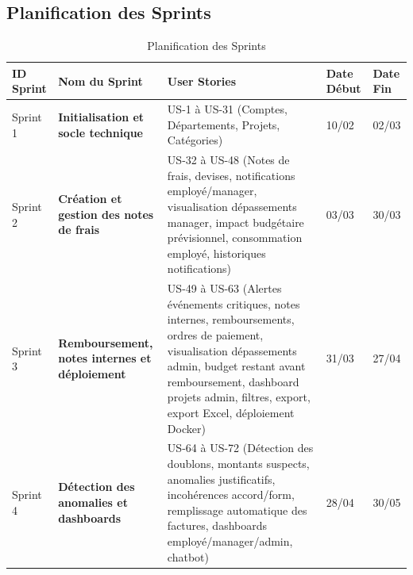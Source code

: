 \documentclass[12pt,a4paper]{report}
\begin{document}
\subsection{Planification des Sprints}



\begin{table}[H]

 \centering

 \caption{Planification des Sprints}

 \label{tab:sprints}

 \begin{tabular}{|p{2.2cm}|p{5cm}|p{4.8cm}|p{1.2cm}|p{1.2cm}|}

 \hline

 \textbf{ID Sprint} & \textbf{Nom du Sprint} & \textbf{User Stories} & \textbf{Date Début} & \textbf{Date Fin} \\

 \hline

 Sprint 1 & \textbf{Initialisation et socle technique} & US-1 à US-31 (Comptes, Départements, Projets, Catégories) & 10/02 & 02/03 \\

 \hline

 Sprint 2 & \textbf{Création et gestion des notes de frais} & US-32 à US-48 (Notes de frais, devises, notifications employé/manager, visualisation dépassements manager, impact budgétaire prévisionnel, consommation employé, historiques notifications) & 03/03 & 30/03 \\

 \hline

 Sprint 3 & \textbf{Remboursement, notes internes et déploiement} & US-49 à US-63 (Alertes événements critiques, notes internes, remboursements, ordres de paiement, visualisation dépassements admin, budget restant avant remboursement, dashboard projets admin, filtres, export, export Excel, déploiement Docker) & 31/03 & 27/04 \\

 \hline

 Sprint 4 & \textbf{Détection des anomalies et dashboards} & US-64 à US-72 (Détection des doublons, montants suspects, anomalies justificatifs, incohérences accord/form, remplissage automatique des factures, dashboards employé/manager/admin, chatbot) & 28/04 & 30/05 \\

 \hline

 \end{tabular}

\end{table}
\end{document}
